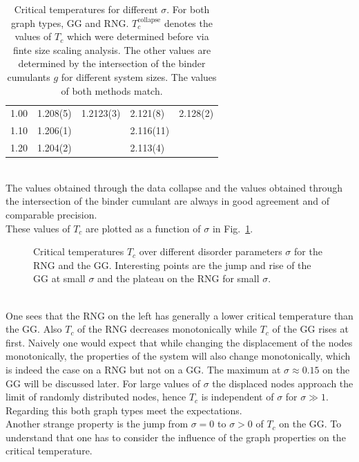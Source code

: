 \begin{table}[htb]
\begin{tabular}{l l l l l}
            1.00 & 1.208(5) & 1.2123(3)& 2.121(8) & 2.128(2)\\
            1.10 & 1.206(1) &          & 2.116(11)&         \\
            1.20 & 1.204(2) &          & 2.113(4) &         \\
            \bottomrule
        \end{tabular}
        \caption[Critical Temperatures for Different $\sigma$]{
            Critical temperatures for different $\sigma$. For both graph
            types, GG and RNG. \(T_c^{\mathrm{collapse}}\) denotes the
            values of \(T_c\) which were determined before via finte
            size scaling analysis. The other values are determined by
            the intersection of the binder cumulants \(g\) for different
            system sizes. The values of both methods match.
        }
        \label{tab:critTemp}
    \end{table}\\
    The values obtained through the data collapse and the values obtained
    through the intersection of the binder cumulant are always in good
    agreement and of comparable precision.\\
    These values of \(T_c\) are plotted as a function of \(\sigma\) in Fig.\ \ref{fig:Tc}.
    \begin{figure}[htbp]
        \centering
        \caption[Critical Temperature over Different Disorder Parameters]
        {
            Critical temperatures \(T_c\) over different
            disorder parameters \(\sigma\) for
             the RNG and
             the GG.
            Interesting points are the jump and rise of the GG at small
            \(\sigma\) and the plateau on the RNG for small \(\sigma\).
        }
        \label{fig:Tc}
    \end{figure}\\
    One sees that the RNG on the left has generally a lower critical
    temperature than the GG.
    Also \(T_c\) of the RNG decreases
    monotonically while \(T_c\) of the GG rises at first. Naively one would
    expect that while changing the displacement of the nodes monotonically,
    the properties of the system will also change monotonically, which is
    indeed the case on a RNG but not on a GG. The
    maximum at \(\sigma \approx 0.15\) on the GG will be discussed later.
    For large values of \(\sigma\) the displaced nodes approach the limit of randomly
    distributed nodes, hence \(T_c\) is independent of \(\sigma\) for
    \(\sigma \gg 1\). Regarding this both graph types meet the expectations.\\
    Another strange property is the jump from \(\sigma = 0\) to \(\sigma > 0\)
    of \(T_c\) on the GG. To understand that one has to
    consider the influence of the graph properties on the critical
    temperature.

